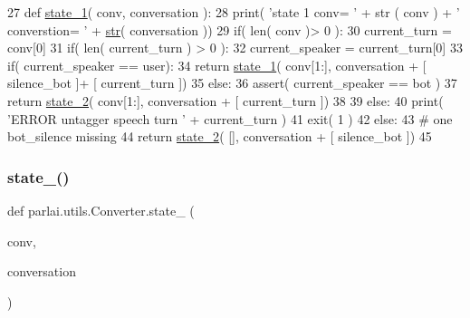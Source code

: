 \begin{DoxyCode}
27 \textcolor{keyword}{def }\hyperlink{namespaceparlai_1_1utils_1_1Converter_a6e544c13c3304bc8e97127997e507bb3}{state\_1}( conv, conversation ):
28     print( \textcolor{stringliteral}{'state 1 conv= '} + str ( conv ) + \textcolor{stringliteral}{' converstion= '} + \hyperlink{namespacegenerate__task__READMEs_a5b88452ffb87b78c8c85ececebafc09f}{str}( conversation ))
29     if( len( conv )> 0 ):
30         current\_turn = conv[0]
31         if( len( current\_turn ) > 0 ):
32             current\_speaker = current\_turn[0]
33             if( current\_speaker == user):
34                 \textcolor{keywordflow}{return} \hyperlink{namespaceparlai_1_1utils_1_1Converter_a6e544c13c3304bc8e97127997e507bb3}{state\_1}( conv[1:], conversation + [ silence\_bot ]+ [ current\_turn ])
35             \textcolor{keywordflow}{else}:
36                 assert( current\_speaker == bot )
37                 \textcolor{keywordflow}{return} \hyperlink{namespaceparlai_1_1utils_1_1Converter_a051af07ed1e796ee044390b710646091}{state\_2}( conv[1:], conversation + [ current\_turn ])
38             
39         \textcolor{keywordflow}{else}:
40             print( \textcolor{stringliteral}{'ERROR untagger speech turn '} + current\_turn )
41             exit( 1 )
42     \textcolor{keywordflow}{else}:
43         \textcolor{comment}{# one bot\_silence missing}
44         \textcolor{keywordflow}{return} \hyperlink{namespaceparlai_1_1utils_1_1Converter_a051af07ed1e796ee044390b710646091}{state\_2}( [], conversation + [ silence\_bot ])
45 
\end{DoxyCode}
\mbox{\label{namespaceparlai_1_1utils_1_1Converter_a051af07ed1e796ee044390b710646091}} 
\subsubsection{\texorpdfstring{state\+\_()}{state\_2()}}
{\footnotesize\ttfamily def parlai.\+utils.\+Converter.\+state\+\_ (\begin{DoxyParamCaption}\item[{}]{conv,  }\item[{}]{conversation }\end{DoxyParamCaption})}



